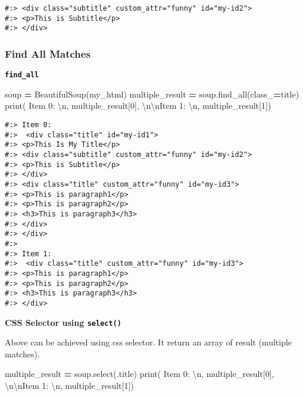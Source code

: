 \documentclass[
]{book}
\newenvironment{Shaded}{\begin{snugshade}}{\end{snugshade}}
\newcommand{\BuiltInTok}[1]{#1}
\newcommand{\CharTok}[1]{\textcolor[rgb]{0.5,0.5,0.5}{#1}}
\newcommand{\DecValTok}[1]{\textcolor[rgb]{0.06,0.06,0.06}{#1}}
\newcommand{\NormalTok}[1]{#1}
\newcommand{\OperatorTok}[1]{\textcolor[rgb]{0.43,0.43,0.43}{\textbf{#1}}}
\newcommand{\StringTok}[1]{\textcolor[rgb]{0.5,0.5,0.5}{#1}}
\begin{document}
\begin{verbatim}
#:> <div class="subtitle" custom_attr="funny" id="my-id2">
#:> <p>This is Subtitle</p>
#:> </div>
\end{verbatim}

\hypertarget{find-all-matches-1}{%
\subsubsection{Find All Matches}\label{find-all-matches-1}}

\textbf{\texttt{find\_all}}

\begin{Shaded}
\begin{Highlighting}[]
\NormalTok{soup }\OperatorTok{=}\NormalTok{ BeautifulSoup(my\_html)}
\NormalTok{multiple\_result }\OperatorTok{=}\NormalTok{ soup.find\_all(class\_}\OperatorTok{=}\StringTok{\textquotesingle{}title\textquotesingle{}}\NormalTok{)}
\BuiltInTok{print}\NormalTok{( }\StringTok{\textquotesingle{}Item 0: }\CharTok{\textbackslash{}n}\StringTok{\textquotesingle{}}\NormalTok{,     multiple\_result[}\DecValTok{0}\NormalTok{],}
       \StringTok{\textquotesingle{}}\CharTok{\textbackslash{}n\textbackslash{}n}\StringTok{Item 1: }\CharTok{\textbackslash{}n}\StringTok{\textquotesingle{}}\NormalTok{, multiple\_result[}\DecValTok{1}\NormalTok{])}
\end{Highlighting}
\end{Shaded}

\begin{verbatim}
#:> Item 0: 
#:>  <div class="title" id="my-id1">
#:> <p>This Is My Title</p>
#:> <div class="subtitle" custom_attr="funny" id="my-id2">
#:> <p>This is Subtitle</p>
#:> </div>
#:> <div class="title" custom_attr="funny" id="my-id3">
#:> <p>This is paragraph1</p>
#:> <p>This is paragraph2</p>
#:> <h3>This is paragraph3</h3>
#:> </div>
#:> </div> 
#:> 
#:> Item 1: 
#:>  <div class="title" custom_attr="funny" id="my-id3">
#:> <p>This is paragraph1</p>
#:> <p>This is paragraph2</p>
#:> <h3>This is paragraph3</h3>
#:> </div>
\end{verbatim}

\textbf{CSS Selector using \texttt{select()}}

Above can be achieved using css selector. It return an array of result (multiple matches).

\begin{Shaded}
\begin{Highlighting}[]
\NormalTok{multiple\_result }\OperatorTok{=}\NormalTok{ soup.select(}\StringTok{\textquotesingle{}.title\textquotesingle{}}\NormalTok{)}
\BuiltInTok{print}\NormalTok{( }\StringTok{\textquotesingle{}Item 0: }\CharTok{\textbackslash{}n}\StringTok{\textquotesingle{}}\NormalTok{,     multiple\_result[}\DecValTok{0}\NormalTok{],}
       \StringTok{\textquotesingle{}}\CharTok{\textbackslash{}n\textbackslash{}n}\StringTok{Item 1: }\CharTok{\textbackslash{}n}\StringTok{\textquotesingle{}}\NormalTok{, multiple\_result[}\DecValTok{1}\NormalTok{])}
\end{Highlighting}
\end{Shaded}
\end{document}
